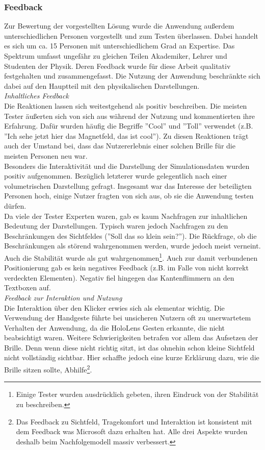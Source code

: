 \subsubsection{Feedback}
Zur Bewertung der vorgestellten Lösung wurde die Anwendung außerdem unterschiedlichen Personen vorgestellt und zum Testen überlassen. Dabei handelt es sich um ca. 15 Personen mit unterschiedlichem Grad an Expertise. Das Spektrum umfasst ungefähr zu gleichen Teilen Akademiker, Lehrer und Studenten der Physik. Deren Feedback wurde für diese Arbeit qualitativ festgehalten und zusammengefasst. Die Nutzung der Anwendung beschränkte sich dabei auf den Hauptteil mit den physikalischen Darstellungen.\\

\textit{Inhaltliches Feedback}\\
Die Reaktionen lassen sich weitestgehend als positiv beschreiben. Die meisten Tester äußerten sich von sich aus während der Nutzung und kommentierten ihre Erfahrung. Dafür wurden häufig die Begriffe ''Cool'' und ''Toll'' verwendet (z.B. ''Ich sehe jetzt hier das Magnetfeld, das ist cool''). Zu diesen Reaktionen trägt auch der Umstand bei, dass das Nutzererlebnis einer solchen Brille für die meisten Personen neu war.\\

Besonders die Interaktivität und die Darstellung der Simulationsdaten wurden positiv aufgenommen. Bezüglich letzterer wurde gelegentlich nach einer volumetrischen Darstellung gefragt. Insgesamt war das Interesse der beteiligten Personen hoch, einige Nutzer fragten von sich aus, ob sie die Anwendung testen dürfen.\\
\noindent\hspace*{5mm}
Da viele der Tester Experten waren, gab es kaum Nachfragen zur inhaltlichen Bedeutung der Darstellungen. Typisch waren jedoch Nachfragen zu den Beschränkungen des Sichtfeldes (''Soll das so klein sein?''). Die Rückfrage, ob die Beschränkungen als störend wahrgenommen werden, wurde jedoch meist verneint. Auch die Stabilität wurde als gut wahrgenommen\footnote{Einige Tester wurden ausdrücklich gebeten, ihren Eindruck von der Stabilität zu beschreiben.}. Auch zur damit verbundenen Positionierung gab es kein negatives Feedback (z.B. im Falle von nicht korrekt verdeckten Elementen). Negativ fiel hingegen das Kantenflimmern an den Textboxen auf.\\

\textit{Feedback zur Interaktion und Nutzung}\\
Die Interaktion über den Klicker erwies sich als elementar wichtig. Die Verwendung der Handgeste führte bei unsicheren Nutzern oft zu unerwartetem Verhalten der Anwendung, da die HoloLens Gesten erkannte, die nicht beabsichtigt waren. Weitere Schwierigkeiten betrafen vor allem das Aufsetzen der Brille. Denn wenn diese nicht richtig sitzt, ist das ohnehin schon kleine Sichtfeld nicht vollständig sichtbar. Hier schaffte jedoch eine kurze Erklärung dazu, wie die Brille sitzen sollte, Abhilfe\footnote{Das Feedback zu Sichtfeld, Tragekomfort und Interaktion ist konsistent mit dem Feedback was Microsoft dazu erhalten hat. Alle drei Aspekte wurden deshalb beim Nachfolgemodell massiv verbessert.}.\\


